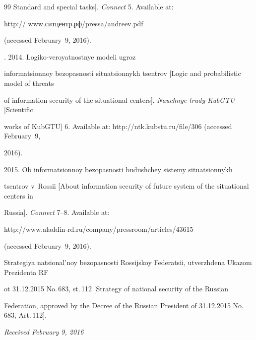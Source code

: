 {{\begin{thebibliography}{99}
Standard and special tasks]. \textit{Connect} 5. Available at: {\sf 

http:// www.ситцентр.рф/pressa/andreev.pdf} (accessed February~9, 2016). 




. 2014. Logiko-veroyatnostnye modeli ugroz 

informatsionnoy bezopasnosti situatsionnykh tsentrov [Logic and probabilistic model of threats 

of information security of the situational centers]. \textit{Nauchnye trudy KubGTU} [Scientific 

works of KubGTU]  6. Available at: {\sf http://ntk.kubstu.ru/file/306} (accessed February~9, 

2016).




 2015. Ob informatsionnoy bezopasnosti budushchey sistemy situatsionnykh 

tsentrov v~Rossii [About information security of future system of the situational centers in 

Russia]. \textit{Connect} 7--8. Available at: {\sf  

http://www.aladdin-rd.ru/\linebreak company/pressroom/articles/43615} (accessed February~9, 2016). 




Strategiya natsional'noy bezopasnosti Rossijskoy Federatsii, utverzhdena Ukazom Prezidenta RF 

ot 31.12.2015 No.\,683, st.\,112 [Strategy of national security of the Russian 

Federation, approved by the Decree of the Russian President of 31.12.2015 No.\,683, Art.\,112].



\end{thebibliography}

} }





\vspace*{-1pt}



\hfill{\small\textit{Received February 9, 2016}}



